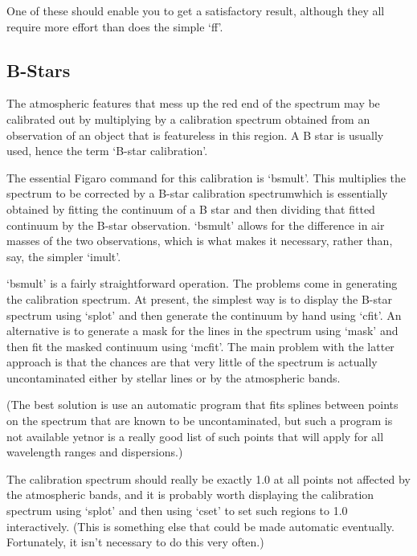    One of these should enable you to get a satisfactory result, although
   they all require more effort than does the simple `ff'.


\subsection{\label{techno2}B-Stars}

   The atmospheric features that mess up the red end of the spectrum may
   be calibrated out by multiplying by a calibration spectrum obtained
   from an observation of an object that is featureless in this region.
   A B star is usually used, hence the term `B-star calibration'.

   The essential Figaro command for this calibration is `bsmult'.  This
   multiplies the spectrum to be corrected by a B-star calibration
   spectrum\latorhtm{---}{-}which is essentially obtained by fitting the
   continuum of
   a B star and then dividing that fitted continuum by the B-star
   observation.  `bsmult' allows for the difference in air masses of the
   two observations, which is what makes it necessary, rather than, say,
   the simpler `imult'.

   `bsmult' is a fairly straightforward operation.  The problems come in
   generating the calibration spectrum.  At present, the simplest way is
   to display the B-star spectrum using `splot' and then generate the
   continuum by hand using `cfit'.  An alternative is to generate a mask
   for the lines in the spectrum using `mask' and then fit the masked
   continuum using `mcfit'.  The main problem with the latter approach
   is that the chances are that very little of the spectrum is actually
   uncontaminated either by stellar lines or by the atmospheric bands.

   (The best solution is use an automatic program that fits splines
   between points on the spectrum that are known to be uncontaminated,
   but such a program is not available yet\latorhtm{---}{-}nor is a really
   good list of such points that will apply for all wavelength ranges and
   dispersions.)

   The calibration spectrum should really be exactly 1.0 at all points
   not affected by the atmospheric bands, and it is probably worth
   displaying the calibration spectrum using `splot' and then using
   `cset' to set such regions to 1.0 interactively.  (This is something
   else that could be made automatic eventually.  Fortunately, it isn't
   necessary to do this very often.)

